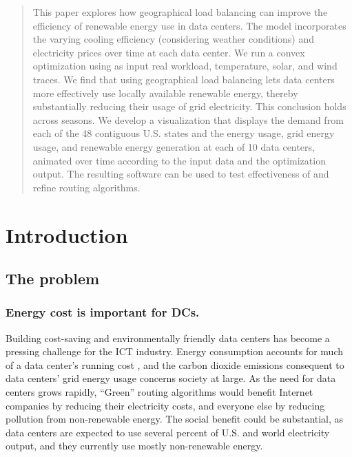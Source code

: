 \documentclass{acm_proc_article-sp}
\begin{document}
\maketitle
\begin{abstract}
This paper explores how geographical load balancing can improve the efficiency of renewable energy use in data centers.
The model incorporates the varying cooling efficiency (considering weather conditions) and electricity prices over time at each data center.
We run a convex optimization using as input real workload, temperature, solar, and wind traces.
We find that using geographical load balancing lets data centers more effectively use locally available renewable energy, thereby substantially reducing their usage of grid electricity. This conclusion holds across seasons.
We develop a visualization that displays the demand from each of the 48 contiguous U.S. states and the energy usage, grid energy usage, and renewable energy generation at each of 10 data centers, animated over time according to the input data and the optimization output. The resulting software can be used to test effectiveness of and refine routing algorithms.


\end{abstract}

\section{Introduction}


\subsection{The problem}
	\subsubsection{Energy cost is important for DCs.}
		Building cost-saving and environmentally friendly data centers has become a pressing challenge for the ICT industry.
		Energy consumption accounts for much of a data center’s running cost \cite{datacenter}, and the carbon dioxide emissions consequent to data centers’ grid energy usage concerns society at large.
		As the need for data centers grows rapidly,
		“Green” routing algorithms would benefit Internet companies by reducing their electricity costs, and everyone else by reducing pollution from non-renewable energy. The social benefit could be substantial, as data centers are expected to use several percent of U.S. and world electricity output, and they currently use mostly non-renewable energy.
		
\end{document}
